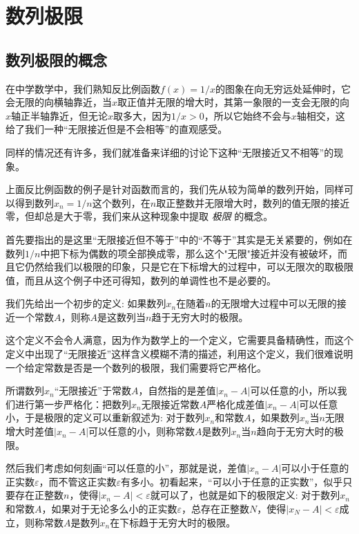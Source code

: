 
\section{数列极限}
\label{sec:limit-of-number-sequence}

\subsection{数列极限的概念}
\label{sec:concept-of-limit-for-number-sequence}

在中学数学中，我们熟知反比例函数$f(x)=1/x$的图象在向无穷远处延伸时，它会无限的向横轴靠近，当$x$取正值并无限的增大时，其第一象限的一支会无限的向$x$轴正半轴靠近，但无论$x$取多大，因为$1/x>0$，所以它始终不会与$x$轴相交，这给了我们一种“无限接近但是不会相等”的直观感受。

同样的情况还有许多，我们就准备来详细的讨论下这种“无限接近又不相等”的现象。

上面反比例函数的例子是针对函数而言的，我们先从较为简单的数列开始，同样可以得到数列$x_n=1/n$这个数列，在$n$取正整数并无限增大时，数列的值无限的接近零，但却总是大于零，我们来从这种现象中提取 \emph{极限} 的概念。

首先要指出的是这里“无限接近但不等于”中的“不等于”其实是无关紧要的，例如在数列$1/n$中把下标为偶数的项全部换成零，那么这个"无限"接近并没有被破坏，而且它仍然给我们以极限的印象，只是它在下标增大的过程中，可以无限次的取极限值，而且从这个例子中还可得知，数列的单调性也不是必要的。

我们先给出一个初步的定义: 如果数列$x_n$在随着$n$的无限增大过程中可以无限的接近一个常数$A$，则称$A$是这数列当$n$趋于无穷大时的极限。

这个定义不会令人满意，因为作为数学上的一个定义，它需要具备精确性，而这个定义中出现了“无限接近”这样含义模糊不清的描述，利用这个定义，我们很难说明一个给定常数是否是一个数列的极限，我们需要将它严格化。

所谓数列$x_n$“无限接近”于常数$A$，自然指的是差值$|x_n-A|$可以任意的小，所以我们进行第一步严格化：把数列$x_n$无限接近常数$A$严格化成差值$|x_n-A|$可以任意小，于是极限的定义可以重新叙述为: 对于数列$x_n$和常数$A$，如果数列$x_n$当$n$无限增大时差值$|x_n-A|$可以任意的小，则称常数$A$是数列$x_n$当$n$趋向于无穷大时的极限。

然后我们考虑如何刻画“可以任意的小”，那就是说，差值$|x_n-A|$可以小于任意的正实数$\varepsilon$，而不管这正实数$\varepsilon$有多小。初看起来，“可以小于任意的正实数”，似乎只要存在正整数$n$，使得$|x_n-A|<\varepsilon$就可以了，也就是如下的极限定义: 对于数列$x_n$和常数$A$，如果对于无论多么小的正实数$\varepsilon$，总存在正整数$N$，使得$|x_N-A|<\varepsilon$成立，则称常数$A$是数列$x_n$在下标趋于无穷大时的极限。

